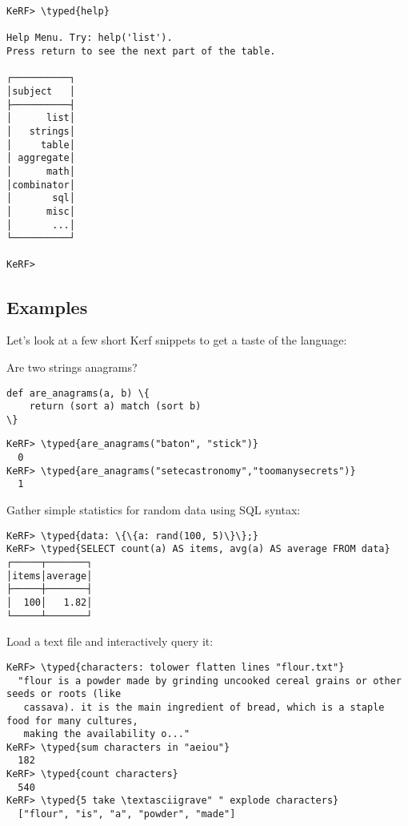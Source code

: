 \documentclass{article}
\newcommand{\typed}[1]{\textcolor{TealBlue}{#1}}
\begin{document}
\vspace{0.5cm}

\begin{Verbatim}
KeRF> \typed{help}

Help Menu. Try: help('list').
Press return to see the next part of the table.

┌──────────┐
│subject   │
├──────────┤
│      list│
│   strings│
│     table│
│ aggregate│
│      math│
│combinator│
│       sql│
│      misc│
│       ...│
└──────────┘

KeRF> 
\end{Verbatim}

\pagebreak
\subsection{Examples}
Let's look at a few short Kerf snippets to get a taste of the language:

\vspace{0.5cm}

Are two strings anagrams?
\begin{Verbatim}
def are_anagrams(a, b) \{
	return (sort a) match (sort b)
\}
\end{Verbatim}
\begin{Verbatim}
KeRF> \typed{are_anagrams("baton", "stick")}
  0
KeRF> \typed{are_anagrams("setecastronomy","toomanysecrets")}
  1
\end{Verbatim}

\vspace{0.5cm}

Gather simple statistics for random data using SQL syntax:
\begin{Verbatim}
KeRF> \typed{data: \{\{a: rand(100, 5)\}\};}
KeRF> \typed{SELECT count(a) AS items, avg(a) AS average FROM data}
┌─────┬───────┐
│items│average│
├─────┼───────┤
│  100│   1.82│
└─────┴───────┘
\end{Verbatim}

\vspace{0.5cm}

Load a text file and interactively query it:
\begin{Verbatim}
KeRF> \typed{characters: tolower flatten lines "flour.txt"}
  "flour is a powder made by grinding uncooked cereal grains or other seeds or roots (like
   cassava). it is the main ingredient of bread, which is a staple food for many cultures,
   making the availability o..."
KeRF> \typed{sum characters in "aeiou"}
  182
KeRF> \typed{count characters}
  540
KeRF> \typed{5 take \textasciigrave" " explode characters}
  ["flour", "is", "a", "powder", "made"]
\end{Verbatim}
\end{document}
